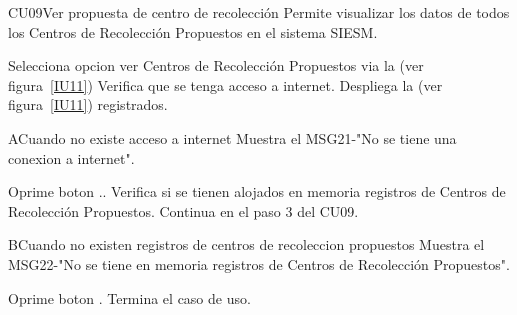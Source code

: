 \begin{UseCase}{CU09}{Ver propuesta de centro de recolección}
    {
    Permite visualizar los datos de todos los Centros de Recolección Propuestos en el sistema SIESM. 
    }
  \end{UseCase}
 
 
\begin{UCtrayectoria}
	\item \UCactor Selecciona opcion ver Centros de Recolección Propuestos via la (ver figura~\ref{IU11}) 
	\UCpaso Verifica que se tenga acceso a internet.
	\UCpaso Despliega la  (ver figura~\ref{IU11}) registrados.
\end{UCtrayectoria}


\begin{UCtrayectoriaA}{A}{Cuando no existe acceso a internet}
	\UCpaso Muestra el MSG21-"No se tiene una conexion a internet".
	\item \UCactor Oprime boton ..
	\UCpaso Verifica si se tienen alojados en memoria registros de Centros de Recolección Propuestos.
	\UCpaso Continua en el paso 3 del CU09.
\end{UCtrayectoriaA}

\begin{UCtrayectoriaA}{B}{Cuando no existen registros de centros de recoleccion propuestos}
	\UCpaso Muestra el MSG22-"No se tiene en memoria registros de Centros de Recolección Propuestos".	
	\item \UCactor Oprime boton  .
	\UCpaso[] Termina el caso de uso.
\end{UCtrayectoriaA}


 
 

 
 
